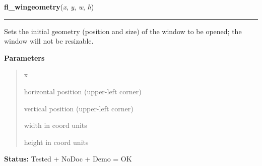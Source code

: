 \hspace{.8\funcindent}\begin{boxedminipage}{\funcwidth}

    \raggedright \textbf{fl\_wingeometry}(\textit{x}, \textit{y}, \textit{w}, \textit{h})

    \vspace{-1.5ex}

    \rule{\textwidth}{0.5\fboxrule}
\setlength{\parskip}{2ex}
    Sets the initial geometry (position and size) of the window to be 
    opened; the window will not be resizable.

\setlength{\parskip}{1ex}
      \textbf{Parameters}
      \vspace{-1ex}

      \begin{quote}
        \begin{Ventry}{x}

          \item[x]

          horizontal position (upper-left corner)

          \item[y]

          vertical position (upper-left corner)

          \item[w]

          width in coord units

          \item[h]

          height in coord units

        \end{Ventry}

      \end{quote}

\textbf{Status:} Tested + NoDoc + Demo = OK



    \end{boxedminipage}

    \label{xformslib:library:fl_wingeometry}

    \vspace{0.5ex}

